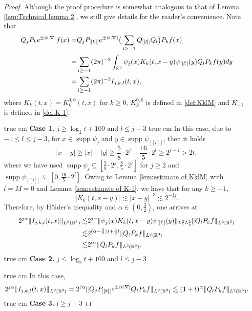 \documentclass[11pt,twoside]{article}
\def\R{\mathop{\mathbb R\kern 0pt}\nolimits}
\def\f{\frac}
\def\ls{\lesssim}
\DeclareMathOperator{\supp}{supp}
\theoremstyle{plain}
\theoremstyle{definition}
\numberwithin{equation}{section}
\begin{document}
	\begin{proof}
		Although the proof procedure is somewhat analogous to that of Lemma \ref{lem:Technical lemma 2},
we still give details for the reader's convenience. Note that
		\begin{equation}
			\begin{split}
				Q_jP_k e^{\pm it|\nabla|}f(x)
				=&Q_jP_{[[k]]} e^{\pm it|\nabla|}\big(\sum_{l\ge-1}Q_{[[l]]}Q_l\big)P_kf(x)\\
				=&\sum_{l\ge-1}(2\pi)^{-3}\int_{\R^3}\psi_j(x)K_k(t,x-y)\psi_{[[l]]}(y)Q_lP_kf(y)dy\\
				=&\sum_{l\ge-1}(2\pi)^{-3} I_{j,k,l}(t,x),
			\end{split}
		\end{equation}
		where $K_k(t,x) = K^{0,0}_k(t,x)$ for $k \ge 0$, $K^{0,0}_k$ is defined in \eqref{def:KklM} and $K_{-1}$ is defined in \eqref{def:K-1}.

 true cm
	\noindent	\textbf{Case 1.} $j\ge \log_2t+100$ and $l\le j-3$
 true cm
 In this case, due to $-1\le l\le j-3$, for $x\in\supp \psi_j$ and $y\in\supp \psi_{[[l]]}$, then it holds
		\begin{equation*}
			|x-y|\ge|x|-|y|\ge {\f{5}{8}}\cdot2^j-\f{16}{5}\cdot2^l\ge2^{j-4}>2t,
		\end{equation*}
		where we have used $\supp{\psi}_j\subseteq [\f{5}{8}\cdot2^j,\f{8}{5}\cdot2^j]$ for $j\ge 2$
and $\supp{\psi}_{[[l]]}\subseteq[0,\f{16}{5}\cdot2^l]$. Owing to Lemma \ref{lem:estimate of KklM} with $l=M=0$ and Lemma \ref{lem:estimate of K-1}, we have that for any $k\ge-1$,
		\begin{equation}
			|K_k(t,x-y)|\ls |x-y|^{-3}\ls 2^{-3j}.
		\end{equation}
		Therefore, by H\"{o}lder's inequality and $\alpha\in(0,\f32)$, one arrives at
		\begin{equation}\label{2.61}
			\begin{split}
				2^{j\alpha}\|I_{j,k,l}(t,x)\|_{L^2(\R^3)}
				\ls&
				2^{j\alpha}\|\psi_j(x)K_k(t,x-y)\psi_{[[l]]}(y)\|_{L^2_xL^2_y}\|Q_lP_kf\|_{L^2(\R^3)}\\
				\ls&
				2^{(\alpha-\f32) j+\f32 l}\|Q_lP_kf\|_{L^2(\R^3)}\\
				\ls&
				2^{l\alpha}\|Q_lP_kf\|_{L^2(\R^3)}.
			\end{split}
		\end{equation}
 true cm
	\noindent	\textbf{Case 2.} $j\le \log_2t+100$ and $l\le j-3$

 true cm
		In this case,
		\begin{equation}\label{2.62}
			2^{j\alpha}\|I_{j,k,l}(t,x)\|_{L^2(\R^3)}=	2^{j\alpha}\|Q_jP_{[[k]]} e^{\pm it|\nabla|} Q_lP_kf\|_{L^2(\R^3)}
			\ls (1+t)^\alpha\|Q_lP_kf\|_{L^2(\R^3)}.
		\end{equation}
 true cm
	\noindent	\textbf{Case 3.} $l\ge j-3$


\end{proof}
\end{document}
